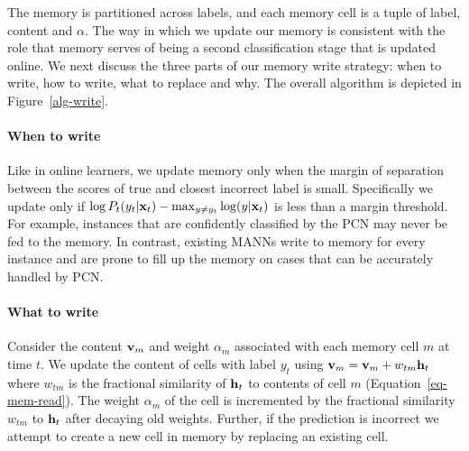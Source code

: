 \documentclass[letterpaper]{article} %
\newcommand{\vek}[1]{{\bf {#1}}}
\newcommand{\vx}{{\vek{x}}}
\newcommand{\vh}{{\vek{h}}}
\newcommand{\vM}{{\vek{v}}}
\def\shiv#1{\todo [color=orange]{Shiv: #1}}
\begin{document}
The memory is partitioned across labels, and each memory cell is a tuple of label, content and $\alpha$.  %
The way in which we update our memory is consistent with the role that memory serves of being a second classification stage that is updated online.  We next discuss the three parts of our memory write strategy: when to write, how to write, what to replace and why. The overall algorithm is depicted in Figure~\ref{alg-write}.
%
\paragraph{When to write}
Like in online learners, we update memory only when the margin of separation between the scores of true and closest incorrect label is small. Specifically we update only if $\log P_t(y_t|\vx_t) - \max_{y \ne y_t} \log (y | \vx_t)$ is less than a margin threshold.  For example, instances that are confidently classified by the PCN may never be fed to the memory.     
In contrast,  existing MANNs write to memory for every instance and are prone to fill up the memory on cases that can be accurately handled by PCN.
\paragraph{What to write}
Consider the content $\vM_m$ and weight $\alpha_m$ associated with
each memory cell $m$ at time $t$.   We update the content of cells with label $y_t$ using $\vM_{m} = \vM_{m} + w_{tm}{\vh_t}$ where $w_{tm}$ is the fractional similarity of $\vh_t$ to contents of cell $m$ (Equation~\ref{eq-mem-read}). The weight $\alpha_m$ of the cell is incremented by the fractional similarity $w_{tm}$ to $\vh_t$ after decaying old weights.
Further, if the prediction is incorrect we attempt to create a new cell in memory  by replacing an existing cell.  
%
\end{document}
